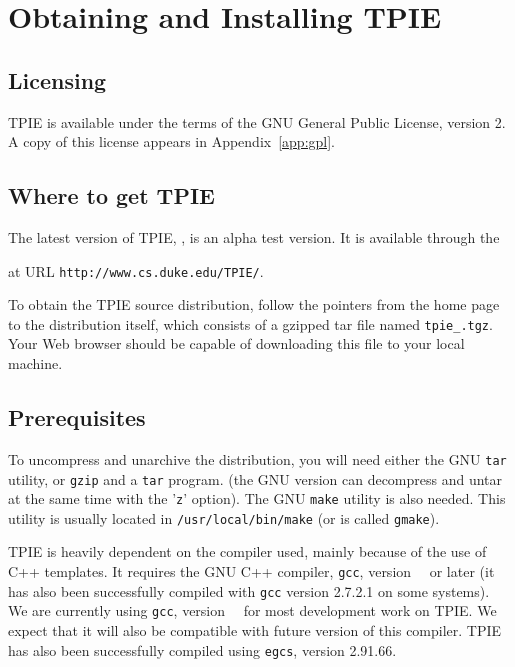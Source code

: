 \chapter{Obtaining and Installing TPIE}

\section{Licensing}

TPIE is available under the terms of the GNU General Public License,
 version 2.  A copy of this license appears in
Appendix~\ref{app:gpl}.

\section{Where to get TPIE}

The latest version of TPIE, \version, is an alpha test version.  It is
available through the %
\begin{latexonly}
at URL \verb|http://www.cs.duke.edu/TPIE/|.
\end{latexonly}
To obtain the TPIE source distribution, follow
the pointers from the home page to the distribution itself, which consists
of a gzipped tar file named {\tt tpie\_\version.tgz}. Your Web browser
should be capable of downloading this file to your local machine.


\section{Prerequisites}
\label{sec:gnu-software}

To uncompress and unarchive the distribution, you will need either the GNU
\verb|tar| utility, or \verb|gzip| and a \verb|tar| program. (the GNU
version can decompress and untar at the same time with the '\verb|z|'
option). The GNU \verb|make| utility is also needed. This utility is
usually located in \verb|/usr/local/bin/make| (or is called
\verb|gmake|).

TPIE is heavily dependent on the compiler used, mainly
because of the use of C++ templates. It requires the GNU C++
compiler, \verb|gcc|, version~\gxxversion~ or later (it has
also been successfully compiled with \verb|gcc| version
2.7.2.1 on some systems). We are currently using \verb|gcc|,
version~\gxxcurrent~ for most development work on TPIE. We
expect that it will also be compatible with future version
of this compiler. TPIE has also been successfully compiled
using \verb|egcs|, version 2.91.66.

